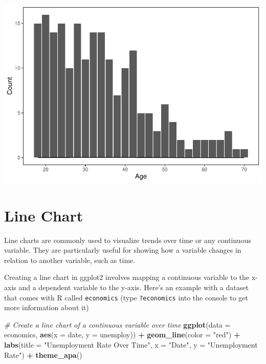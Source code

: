 \documentclass[
]{book}
\newenvironment{Shaded}{\begin{snugshade}}{\end{snugshade}}
\newcommand{\AttributeTok}[1]{\textcolor[rgb]{0.13,0.29,0.53}{#1}}
\newcommand{\CommentTok}[1]{\textcolor[rgb]{0.56,0.35,0.01}{\textit{#1}}}
\newcommand{\FunctionTok}[1]{\textcolor[rgb]{0.13,0.29,0.53}{\textbf{#1}}}
\newcommand{\NormalTok}[1]{#1}
\newcommand{\SpecialCharTok}[1]{\textcolor[rgb]{0.81,0.36,0.00}{\textbf{#1}}}
\newcommand{\StringTok}[1]{\textcolor[rgb]{0.31,0.60,0.02}{#1}}
\begin{document}
\includegraphics{rintro_demo_files/figure-latex/unnamed-chunk-326-1.pdf}

\hypertarget{line-chart}{%
\section{Line Chart}\label{line-chart}}

Line charts are commonly used to visualize trends over time or any continuous variable. They are particularly useful for showing how a variable changes in relation to another variable, such as time.

Creating a line chart in ggplot2 involves mapping a continuous variable to the x-axis and a dependent variable to the y-axis. Here's an example with a dataset that comes with R called \texttt{economics} (type \texttt{?economics} into the console to get more information about it)

\begin{Shaded}
\begin{Highlighting}[]
\CommentTok{\# Create a line chart of a continuous variable over time}
\FunctionTok{ggplot}\NormalTok{(}\AttributeTok{data =}\NormalTok{ economics, }\FunctionTok{aes}\NormalTok{(}\AttributeTok{x =}\NormalTok{ date, }\AttributeTok{y =}\NormalTok{ unemploy)) }\SpecialCharTok{+}
  \FunctionTok{geom\_line}\NormalTok{(}\AttributeTok{color =} \StringTok{"red"}\NormalTok{) }\SpecialCharTok{+}
  \FunctionTok{labs}\NormalTok{(}\AttributeTok{title =} \StringTok{"Unemployment Rate Over Time"}\NormalTok{, }\AttributeTok{x =} \StringTok{"Date"}\NormalTok{, }\AttributeTok{y =} \StringTok{"Unemployment Rate"}\NormalTok{) }\SpecialCharTok{+}
  \FunctionTok{theme\_apa}\NormalTok{()}
\end{Highlighting}
\end{Shaded}
\end{document}
